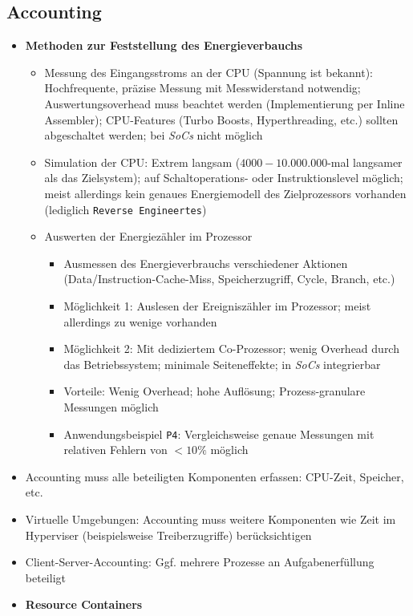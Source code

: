 \subsection{Accounting}
\begin{itemize}
	\item \textbf{Methoden zur Feststellung des Energieverbauchs}
	\begin{itemize}
		\item Messung des Eingangsstroms an der CPU (Spannung ist bekannt): Hochfrequente, präzise Messung mit Messwiderstand notwendig; Auswertungsoverhead muss beachtet werden (Implementierung per Inline Assembler); CPU-Features (Turbo Boosts, Hyperthreading, etc.) sollten abgeschaltet werden; bei \textit{SoCs} nicht möglich
		\item Simulation der CPU: Extrem langsam (\(4000-10.000.000\)-mal langsamer als das Zielsystem); auf Schaltoperations- oder Instruktionslevel möglich; meist allerdings kein genaues Energiemodell des Zielprozessors vorhanden (lediglich \texttt{Reverse Engineertes})
		\item Auswerten der Energiezähler im Prozessor
		\begin{itemize}
			\item Ausmessen des Energieverbrauchs verschiedener Aktionen (Data/Instruction-Cache-Miss, Speicherzugriff, Cycle, Branch, etc.)
			\item Möglichkeit 1: Auslesen der Ereigniszähler im Prozessor; meist allerdings zu wenige vorhanden
			\item Möglichkeit 2: Mit dediziertem Co-Prozessor; wenig Overhead durch das Betriebssystem; minimale Seiteneffekte; in \textit{SoCs} integrierbar
			\item Vorteile: Wenig Overhead; hohe Auflösung; Prozess-granulare Messungen möglich
			\item Anwendungsbeispiel \texttt{P4}: Vergleichsweise genaue Messungen mit relativen Fehlern von \(< 10\%\) möglich
		\end{itemize}
	\end{itemize}
	\item Accounting muss alle beteiligten Komponenten erfassen: CPU-Zeit, Speicher, etc.
	\item Virtuelle Umgebungen: Accounting muss weitere Komponenten wie Zeit im Hyperviser (beispielsweise Treiberzugriffe) berücksichtigen
	\item Client-Server-Accounting: Ggf. mehrere Prozesse an Aufgabenerfüllung beteiligt
	\item \textbf{Resource Containers}

\end{itemize}
